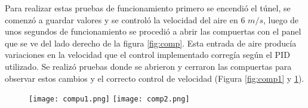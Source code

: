 Para realizar estas pruebas de funcionamiento primero se encendió el túnel, se comenzó a guardar valores y se controló la velocidad del aire en 6 $m/s$, luego de unos segundos de funcionamiento se procedió a abrir las compuertas con el panel que se ve del lado derecho de la figura \ref{fig:comp}. Esta entrada de aire producía variaciones en la velocidad que el control implementado corregía según el PID utilizado. Se realizó pruebas donde se abrieron y cerraron las compuertas para observar estos cambios y el correcto control de velocidad (Figura \ref{fig:comp1} y \ref{fig:comp2}).


\begin{figure}[H]
	\centering
	\texttt{[image: compu1.png]}
	\label{fig:comp1}
	\texttt{[image: comp2.png]}
	\label{fig:comp2}
\end{figure}



    \newpage